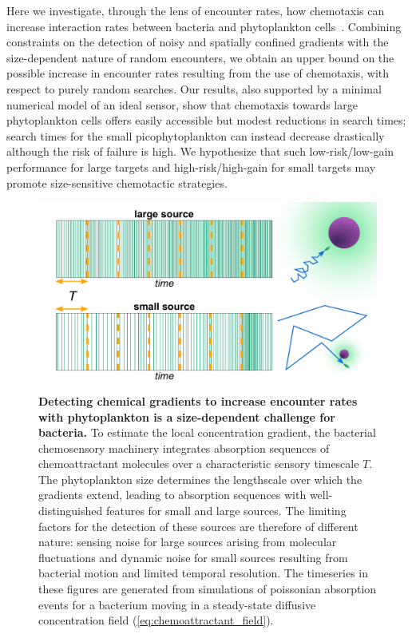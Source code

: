 \documentclass[9pt,twocolumn,twoside]{pnas-new}
\begin{document}
Here we investigate, through the lens of encounter rates, how chemotaxis can increase interaction rates between bacteria and phytoplankton cells~\cite{slomka2023encounter}. Combining constraints on the detection of noisy and spatially confined gradients with the size-dependent nature of random encounters, we obtain an upper bound on the possible increase in encounter rates resulting from the use of chemotaxis, with respect to purely random searches. Our results, also supported by a minimal numerical model of an ideal sensor, show that chemotaxis towards large phytoplankton cells offers easily accessible but modest reductions in search times; search times for the small picophytoplankton can instead decrease drastically although the risk of failure is high. We hypothesize that such low-risk/low-gain performance for large targets and high-risk/high-gain for small targets may promote size-sensitive chemotactic strategies.


\begin{figure}
    \centering
    \includegraphics[width=11.4cm]{fig1_new.pdf}
    \caption{
        \textbf{
        Detecting chemical gradients to increase encounter rates with phytoplankton is a size-dependent challenge for bacteria.
        }
        To estimate the local concentration gradient, the bacterial chemosensory machinery integrates absorption sequences of chemoattractant molecules over a characteristic sensory timescale $T$.
        The phytoplankton size determines the lengthscale over which the gradients extend, leading to absorption sequences with well-distinguished features for small and large sources.
        The limiting factors for the detection of these sources are therefore of different nature: sensing noise for large sources arising from molecular fluctuations and dynamic noise for small sources resulting from bacterial motion and limited temporal resolution.
        The timeseries in these figures are generated from simulations of poissonian absorption events for a bacterium moving in a steady-state diffusive concentration field (\autoref{eq:chemoattractant_field}).
    }
    \label{fig:setup}
\end{figure}
\end{document}
